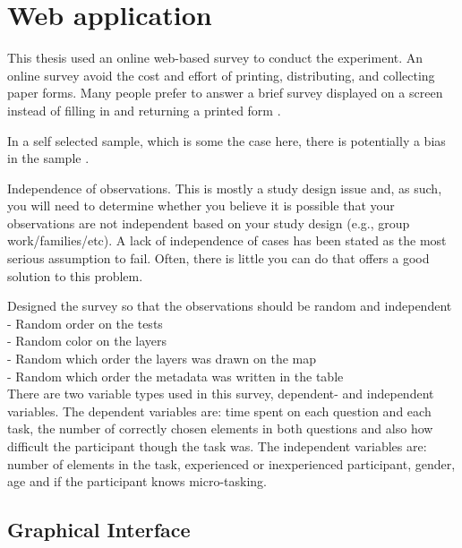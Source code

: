 \section{Web application}
This thesis used an online web-based survey to conduct the experiment. An online survey avoid the cost and effort of printing, distributing, and collecting paper forms. Many people prefer to answer a brief survey displayed on a screen instead of filling in and returning a printed form \citep{Ben2009}.   

In a self selected sample, which is some the case here, there is potentially a bias in the sample \citep{Ben2009}. %

Independence of observations. This is mostly a study design issue and, as such, you will need to determine whether you believe it is possible that your observations are not independent based on your study design (e.g., group work/families/etc). A lack of independence of cases has been stated as the most serious assumption to fail. Often, there is little you can do that offers a good solution to this problem. %


Designed the survey so that the observations should be random and independent \\
- Random order on the tests \\
- Random color on the layers \\
- Random which order the layers was drawn on the map \\
- Random which order the metadata was written in the table \\

There are two variable types used in this survey, dependent- and independent variables. The dependent variables are: time spent on each question and each task, the number of correctly chosen elements in both questions and also how difficult the participant though the task was. The independent variables are: number of elements in the task, experienced or inexperienced participant, gender, age and if the participant knows micro-tasking. 

\subsection{Graphical Interface}

